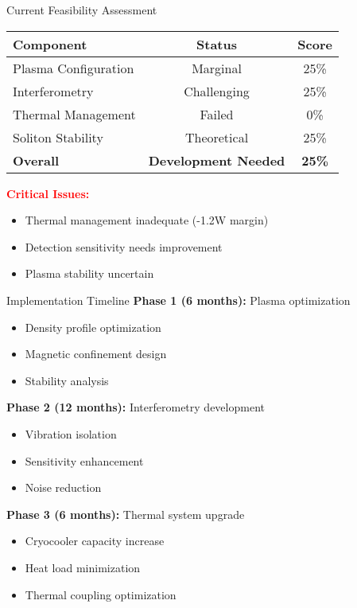 \documentclass[aspectratio=169,xcolor={table,dvipsnames}]{beamer}
\newcommand{\highlight}[1]{\textcolor{red}{\textbf{#1}}}
\begin{document}
\begin{frame}{Current Feasibility Assessment}
    \begin{table}
        \centering
        \begin{tabular}{lcc}
            \toprule
            \textbf{Component} & \textbf{Status} & \textbf{Score} \\
            \midrule
            Plasma Configuration & Marginal & 25\% \\
            Interferometry & Challenging & 25\% \\
            Thermal Management & Failed & 0\% \\
            Soliton Stability & Theoretical & 25\% \\
            \midrule
            \textbf{Overall} & \textbf{Development Needed} & \textbf{25\%} \\
            \bottomrule
        \end{tabular}
    \end{table}
    
    \highlight{Critical Issues:}
    \begin{itemize}
        \item Thermal management inadequate (-1.2W margin)
        \item Detection sensitivity needs improvement
        \item Plasma stability uncertain
    \end{itemize}
\end{frame}

\begin{frame}{Implementation Timeline}
    \textbf{Phase 1 (6 months):} Plasma optimization
    \begin{itemize}
        \item Density profile optimization
        \item Magnetic confinement design
        \item Stability analysis
    \end{itemize}
    
    \textbf{Phase 2 (12 months):} Interferometry development
    \begin{itemize}
        \item Vibration isolation
        \item Sensitivity enhancement
        \item Noise reduction
    \end{itemize}
    
    \textbf{Phase 3 (6 months):} Thermal system upgrade
    \begin{itemize}
        \item Cryocooler capacity increase
        \item Heat load minimization
        \item Thermal coupling optimization
    \end{itemize}
\end{frame}
\end{document}
